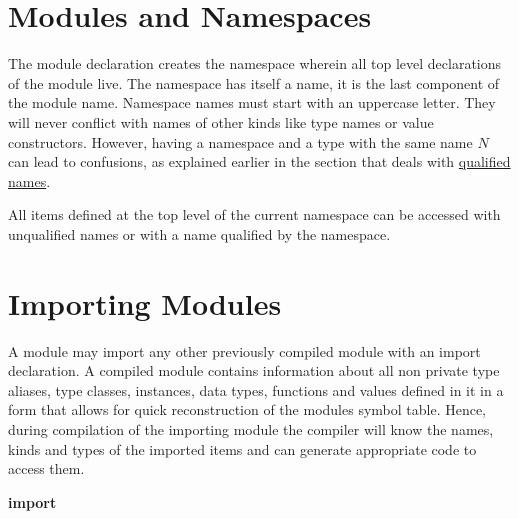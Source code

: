 \section{Modules and Namespaces}

The module declaration creates the namespace wherein all top level declarations 
of the module live. The namespace has itself a name,
it is the last component of the module name. Namespace names must start
with an uppercase letter. They will never conflict with names of other
kinds like type names or value constructors. 
However, having a namespace and a type with the same name $N$ can lead to confusions, as explained earlier in the section that deals with \hyperref[qualified names]{qualified names}.

All items defined at the top level of the current namespace can be
accessed with unqualified names or with a name qualified by the
namespace.


\section{Importing Modules} \label{import} 


A module may import any other previously compiled module with an import declaration.
A compiled module contains information about all non private type aliases, type classes, instances, 
data types, functions and values defined in it in a form that allows for quick reconstruction of the modules symbol table.
Hence, during compilation of the importing module the compiler will know the names, kinds and types of the imported items and can generate appropriate code to access them.

\begin{flushleft}
 \textbf{import}     {}\\
  \sym{(}  \sym{)} \\
   \\
  \oder{}    \oder{}  \oder{} 
  \oder{}   \oder{}  \\
  \oder {}   \oder {}  \\
 \sym{(}  \sym{)}\\
   \\
   \oder {}  \oder {}  \\
  \\
\end{flushleft}

